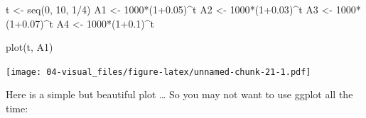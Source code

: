 \documentclass[
]{book}
\newenvironment{Shaded}{\begin{snugshade}}{\end{snugshade}}
\newcommand{\DecValTok}[1]{\textcolor[rgb]{0.00,0.00,0.81}{#1}}
\newcommand{\FloatTok}[1]{\textcolor[rgb]{0.00,0.00,0.81}{#1}}
\newcommand{\FunctionTok}[1]{\textcolor[rgb]{0.00,0.00,0.00}{#1}}
\newcommand{\NormalTok}[1]{#1}
\newcommand{\OtherTok}[1]{\textcolor[rgb]{0.56,0.35,0.01}{#1}}
\newcommand{\SpecialCharTok}[1]{\textcolor[rgb]{0.00,0.00,0.00}{#1}}
\begin{document}
\begin{Shaded}
\begin{Highlighting}[]
\NormalTok{t }\OtherTok{\textless{}{-}} \FunctionTok{seq}\NormalTok{(}\DecValTok{0}\NormalTok{, }\DecValTok{10}\NormalTok{, }\DecValTok{1}\SpecialCharTok{/}\DecValTok{4}\NormalTok{)}
\NormalTok{A1 }\OtherTok{\textless{}{-}} \DecValTok{1000}\SpecialCharTok{*}\NormalTok{(}\DecValTok{1}\FloatTok{+0.05}\NormalTok{)}\SpecialCharTok{\^{}}\NormalTok{t}
\NormalTok{A2 }\OtherTok{\textless{}{-}} \DecValTok{1000}\SpecialCharTok{*}\NormalTok{(}\DecValTok{1}\FloatTok{+0.03}\NormalTok{)}\SpecialCharTok{\^{}}\NormalTok{t}
\NormalTok{A3 }\OtherTok{\textless{}{-}} \DecValTok{1000}\SpecialCharTok{*}\NormalTok{(}\DecValTok{1}\FloatTok{+0.07}\NormalTok{)}\SpecialCharTok{\^{}}\NormalTok{t}
\NormalTok{A4 }\OtherTok{\textless{}{-}} \DecValTok{1000}\SpecialCharTok{*}\NormalTok{(}\DecValTok{1}\FloatTok{+0.1}\NormalTok{)}\SpecialCharTok{\^{}}\NormalTok{t}
\end{Highlighting}
\end{Shaded}

\begin{Shaded}
\begin{Highlighting}[]
\FunctionTok{plot}\NormalTok{(t, A1)}
\end{Highlighting}
\end{Shaded}

\texttt{[image: 04-visual\_files/figure-latex/unnamed-chunk-21-1.pdf]}

Here is a simple but beautiful plot \ldots{} So you may not want to use ggplot all the time:
\end{document}
